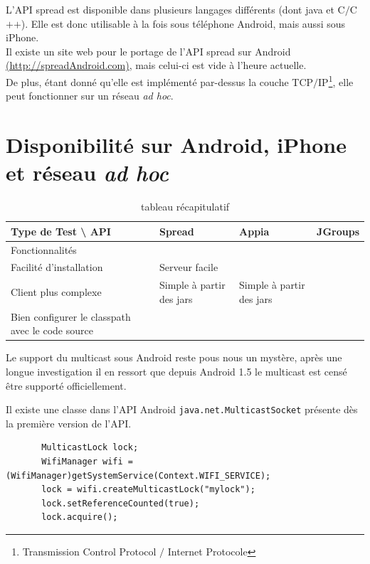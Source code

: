 \documentclass[a4paper,10pt]{report}
\begin{document}
L'API spread est disponible dans plusieurs langages différents (dont java et C$/$C$+$$+$). Elle est donc utilisable à la fois sous téléphone Android, mais aussi sous iPhone.\\
Il existe un site web pour le portage de l'API spread sur Android \href{http://spreadAndroid.com}{(http://spreadAndroid.com)}, mais celui-ci est vide à l'heure actuelle.\\
De plus, étant donné qu'elle est implémenté par-dessus la couche TCP$/$IP\footnote{Transmission Control Protocol $/$ Internet Protocole}, elle peut fonctionner sur un réseau \emph{ad hoc}.


\section{Disponibilité sur Android, iPhone et réseau \emph{ad hoc}}

\begin{table}[!hbp]
  \begin{centering}
    \begin{tabular}{|>{\centering}m{4cm}|>{\centering}m{4cm}|>{\centering}m{4cm}|>{\centering}m{4cm}|}
      \hline 
      Type de Test \textbackslash{} API & Spread & Appia & JGroups\tabularnewline
      \hline
      \hline 
      Fonctionnalités & \multicolumn{3}{c|}{API de communication}\tabularnewline
      \hline 
      Facilité d'installation & Serveur facile \\ Client plus complexe & Simple à partir des jars & Simple à partir des jars \\ Bien configurer le classpath avec le code source\tabularnewline
      \hline
    \end{tabular}
  \par\end{centering}
\caption{\label{tab_recap}tableau récapitulatif}
\end{table}


Le support du multicast sous Android reste pous nous un mystère, après une longue investigation il en ressort que depuis Android 1.5 le multicast est censé être supporté officiellement.
\lstset{language=java} 

Il existe une classe dans l'API Android \lstinline{java.net.MulticastSocket} présente dès la première version de l'API.

\lstset{commentstyle=\textit} 
\begin{lstlisting}
       MulticastLock lock;
       WifiManager wifi = (WifiManager)getSystemService(Context.WIFI_SERVICE);
       lock = wifi.createMulticastLock("mylock");
       lock.setReferenceCounted(true);
       lock.acquire();
\end{lstlisting} 
\end{document}

